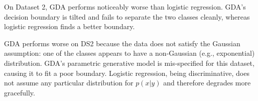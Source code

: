 \begin{answer}
On Dataset 2, GDA performs noticeably worse than logistic regression. GDA's decision boundary is tilted and fails to separate the two classes cleanly, whereas logistic regression finds a better boundary.

GDA performs worse on DS2 because the data does not satisfy the Gaussian assumption: one of the classes appears to have a non-Gaussian (e.g., exponential) distribution. GDA's parametric generative model is mis-specified for this dataset, causing it to fit a poor boundary. Logistic regression, being discriminative, does not assume any particular distribution for $p(x|y)$ and therefore degrades more gracefully.
\end{answer}
